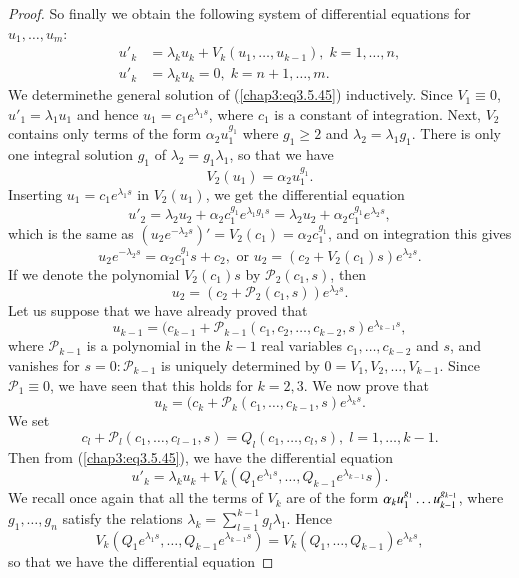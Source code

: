 \begin{proof}
So finally we obtain the following system of differential equations
for $u_1, \ldots, u_m$: 
\begin{align*}
u'_k & = \lambda_k u_k + V_k (u_1, \ldots, u_{k-1}), \; k = 1, \ldots,
n, \\ 
u'_k & = \lambda_k u_k = 0, \; k = n+1, \ldots,
m. \tag{3.5.45}\label{chap3:eq3.5.45} 
\end{align*}
We determine\pageoriginale the general solution of
(\ref{chap3:eq3.5.45}) inductively. Since $V_1 \equiv 0$, $u'_1 =
\lambda_1 u_1$ and hence $u_1 = c_1 e^{\lambda_1 s}$, where $c_1$ is a
constant of integration. Next, $V_2$ contains only terms of the form
$\alpha_2 u^{g_1}_1$ where $g_1 \geq 2$ and $\lambda_2 = \lambda_1
g_1$. There is only one integral solution $g_1$ of $\lambda_2 =g_1
\lambda_1$, so that we have  
$$
V_2 (u_1) = \alpha_2 u^{g_1}_1. 
$$  
Inserting $u_1 = c_1 e^{\lambda_1 s }$ in $V_2 (u_1)$, we get the
differential equation 
$$
u'_2 = \lambda_2 u_2  + \alpha_2 c^{g_1}_1 e^{\lambda_1 g_1 s} =
\lambda_2 u_2 + \alpha_2 c^{g_1}_1 e^{\lambda_2 s}, 
$$
which is the same as $(u_2 e^{-\lambda_2 s})' = V_2 (c_1) =\alpha_2
c^{g_1}_1$, and on integration this gives 
$$
u_2 e^{-\lambda_2 s} = \alpha_2 c^{g_1}_1 s + c_2, \text{ or } u_2 =
(c_2 + V_2 (c_1) s)e^{\lambda_2s}. 
$$
If we denote the polynomial $V_2(c_1) s$ by $\mathscr{P}_2 (c_1, s)$,
then 
$$
u_2 = (c_2 + \mathscr{P}_2 (c_1, s))e^{\lambda_2 s}.
$$
Let us suppose that we have already proved that 
$$
u_{k-1} = (c_{k-1} + \mathscr{P}_{k-1} (c_1, c_2, \ldots, c_{k-2}, s)e^{\lambda_{k-1} s}, 
$$
where $\mathscr{P}_{k-1}$ is a polynomial in the $k-1$ real variables
$c_1, \ldots, c_{k-2}$ and $s$, and vanishes for $s=0:
\mathscr{P}_{k-1}$ is uniquely determined by $0 = V_1, V_2, \ldots,
V_{k-1}$. Since $\mathscr{P}_1 \equiv 0$, we have seen that this holds
for $k=2,3$. We now prove that  
$$
u_k = (c_k + \mathscr{P}_k(c_1, \ldots, c_{k-1}, s)e^{\lambda_k s}. 
$$\pageoriginale
We set
$$
c_l + \mathscr{P}_l  (c_1, \ldots, c_{l-1}, s) = Q_l (c_1, \ldots,
c_l, s), \; l = 1, \ldots, k-1.  
$$
Then from (\ref{chap3:eq3.5.45}), we have the differential equation 
$$
u'_k = \lambda_k u_k + V_k (Q_1 e^{\lambda_1s}, \ldots, Q_{k-1}
e^{\lambda_{k-1}} s). 
$$
We recall once again that all the terms of $V_k$ are of the form 
$\alpha_k u^{g_1}_1\break \ldots u^{g_{k-1}}_{k-1}$, where $g_1 , \ldots,
g_n$ satisfy the relations $\lambda_k = \sum\limits^{k-1}_{l=1} g_l
\lambda_1$. Hence  
$$
V_k (Q_1 e^{\lambda_1 s}, \ldots, Q_{k-1} e^{\lambda_{k-1} s}) = V_k
(Q_1, \ldots , Q_{k-1}) e^{\lambda_k s}, 
$$
so that we have the differential equation

\end{proof}
